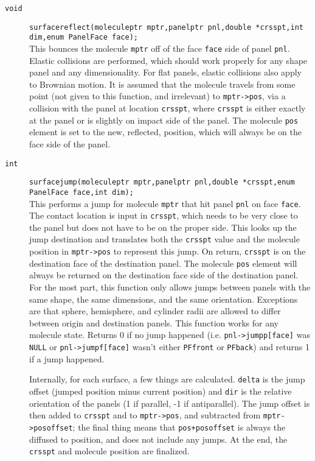 \documentclass {book}
\begin{document}
\begin{description}
\item[\texttt{void}]
\texttt{surfacereflect(moleculeptr mptr,panelptr pnl,double *crsspt,int dim,enum PanelFace face);}
\hfill \\
This bounces the molecule \texttt{mptr} off of the face \texttt{face} side of panel \texttt{pnl}.  Elastic collisions are performed, which should work properly for any shape panel and any dimensionality.  For flat panels, elastic collisions also apply to Brownian motion.  It is assumed that the molecule travels from some point (not given to this function, and irrelevant) to \texttt{mptr->pos}, via a collision with the panel at location \texttt{crsspt}, where \texttt{crsspt} is either exactly at the panel or is slightly on impact side of the panel.  The molecule \texttt{pos} element is set to the new, reflected, position, which will always be on the face side of the panel.

\item[\texttt{int}]
\texttt{surfacejump(moleculeptr mptr,panelptr pnl,double *crsspt,enum PanelFace face,int dim);}
\hfill \\
This performs a jump for molecule \texttt{mptr} that hit panel \texttt{pnl} on face \texttt{face}.  The contact location is input in \texttt{crsspt}, which needs to be very close to the panel but does not have to be on the proper side.  This looks up the jump destination and translates both the \texttt{crsspt} value and the molecule position in \texttt{mptr->pos} to represent this jump.  On return, \texttt{crsspt} is on the destination face of the destination panel.  The molecule \texttt{pos} element will always be returned on the destination face side of the destination panel.  For the most part, this function only allows jumps between panels with the same shape, the same dimensions, and the same orientation.  Exceptions are that sphere, hemisphere, and cylinder radii are allowed to differ between origin and destination panels.  This function works for any molecule state.  Returns 0 if no jump happened (i.e. \texttt{pnl->jumpp[face]} was \texttt{NULL} or \texttt{pnl->jumpf[face]} wasn't either \texttt{PFfront} or \texttt{PFback}) and returns 1 if a jump happened.

Internally, for each surface, a few things are calculated.  \texttt{delta} is the jump offset (jumped position minus current position) and \texttt{dir} is the relative orientation of the panels (1 if parallel, -1 if antiparallel).  The jump offset is then added to \texttt{crsspt} and to \texttt{mptr->pos}, and subtracted from \texttt{mptr->posoffset}; the final thing means that \texttt{pos+posoffset} is always the diffused to position, and does not include any jumps.  At the end, the \texttt{crsspt} and molecule position are finalized.


\end{description}
\end{document}
